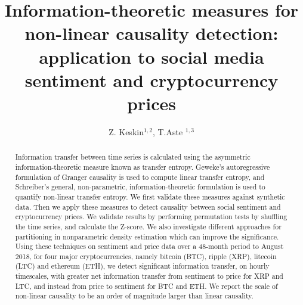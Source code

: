 \documentclass[]{rsos}%
\begin{document}
\title{Information-theoretic measures for non-linear causality detection: \\ application to social media sentiment and cryptocurrency prices}

\author{%
Z. Keskin$^{1,2}$, T.Aste $^{1,3}$}

\address{$^{1}$Department of Computer Science \& Centre for Blockchain Technologies, University College London, Gower Street, WC1E 6EA, London, United Kingdom.\\
$^{2}$Department of Physics and Astronomy, University College London, Gower Street, WC1E 6EA, London, United Kingdom.
$^3$ UCL Centre for Blockchain Technologies, University College London, London, United Kingdom.}

\subject{Information Theory, Causality, Computational Statistics, Time Series Analysis}
 


\begin{abstract}
    Information transfer between time series is calculated using the asymmetric information-theoretic measure known as transfer entropy. Geweke's autoregressive formulation of Granger causality is used to compute linear transfer entropy, and Schreiber's general, non-parametric, information-theoretic formulation is used to quantify non-linear transfer entropy. 
    We first validate these measures against synthetic data. Then we apply these measures to detect causality between social sentiment and cryptocurrency prices. We validate results by performing permutation tests by shuffling the time series, and calculate the Z-score. We also investigate different approaches for partitioning in nonparametric density estimation which can improve the significance. 
    Using these techniques on sentiment and price data over a 48-month period to August 2018, for four major cryptocurrencies, namely bitcoin (BTC), ripple (XRP), litecoin (LTC) and ethereum (ETH), we detect significant information transfer, on hourly timescales, with greater net information transfer from sentiment to price for XRP and LTC, and instead from price to sentiment for BTC and ETH. We report the scale of non-linear causality to be an order of magnitude larger than linear causality.
\end{abstract}
\end{document}
